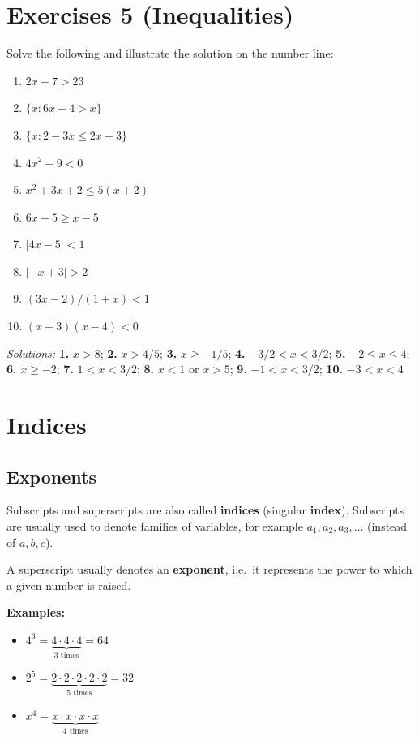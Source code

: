 \documentclass[
  english,
  12pt,
  oneside]{book}
\providecommand{\tightlist}{%
  \setlength{\itemsep}{0pt}\setlength{\parskip}{0pt}}
\theoremstyle{definition}
\theoremstyle{definition}
\theoremstyle{definition}
\theoremstyle{definition}
\theoremstyle{remark}
\begin{document}
\chapter*{Exercises 5 (Inequalities)}\label{exercises-5-inequalities}

Solve the following and illustrate the solution on the number line:

\begin{enumerate}
\def\labelenumi{\arabic{enumi}.}
\item
  \(2x+7>23\)
\item
  \(\{x: 6x-4>x\}\)
\item
  \(\{x: 2-3x \leq 2x+3\}\)
\item
  \(4x^2-9<0\)
\item
  \(x^2+3x+2\leq 5(x+2)\)
\item
  \(6x+5\geq x-5\)
\item
  \(|4x-5|<1\)
\item
  \(|-x+3|>2\)
\item
  \((3x-2) / (1+x)<1\)
\item
  \((x+3)(x-4)<0\)
\end{enumerate}

\emph{Solutions:}
\textbf{1.} \(x>8\);
\textbf{2.} \(x>4/5\);
\textbf{3.} \(x\geq-1/5\);
\textbf{4.} \(-3/2< x< 3/2\);
\textbf{5.} \(-2\leq x\leq4\);
\textbf{6.} \(x\geq-2\);
\textbf{7.} \(1<x<3/2\);
\textbf{8.} \(x<1\) or \(x>5\);
\textbf{9.} \(-1<x<3/2\);
\textbf{10.} \(-3<x<4\)

\chapter{Indices}\label{indices}

\section{Exponents}\label{exponents}

Subscripts and superscripts are also called \textbf{indices} (singular \textbf{index}). Subscripts are usually used to denote families of variables, for example \(a_1,a_2,a_3,\dots\) (instead of \(a,b,c\)).

A superscript usually denotes an \textbf{exponent}, i.e.~it represents the power to which a given number is raised.

\textbf{Examples:}

\begin{itemize}
\tightlist
\item
  \(4^3=\underbrace{4\cdot4\cdot4}_{3\text{ times}}=64\)
\item
  \(2^5=\underbrace{2\cdot2\cdot2\cdot2\cdot2}_{5\text{ times}}=32\)
\item
  \(x^4=\underbrace{x\cdot x\cdot x\cdot x}_{4\text{ times}}\)
\end{itemize}
\end{document}
